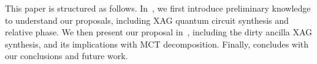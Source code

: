 This paper is structured as follows. In~, we first introduce preliminary
knowledge to understand our proposals, including XAG quantum circuit synthesis and
relative phase. We then present our proposal in~, including the dirty
ancilla XAG synthesis, and its implications with MCT decomposition. Finally, 
concludes with our conclusions and future work.








